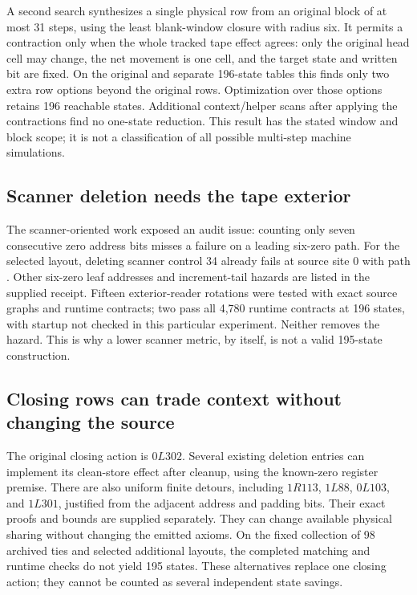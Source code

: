 \documentclass[11pt,a4paper]{article}
\newcommand{\code}[1]{\texttt{\detokenize{#1}}}
\begin{document}
A second search synthesizes a single physical row from an original block
of at most 31 steps, using the least blank-window closure with radius six.
It permits a contraction only when the whole tracked tape effect agrees:
only the original head cell may change, the net movement is one cell, and
the target state and written bit are fixed. On the original and separate
196-state tables this finds only two extra row options beyond the original
rows. Optimization over those options retains 196 reachable states.
Additional context/helper scans after applying the contractions find no
one-state reduction. This result has the stated window and block scope;
it is not a classification of all possible multi-step machine simulations.

\subsection{Scanner deletion needs the tape exterior}

The scanner-oriented work exposed an audit issue: counting only seven
consecutive zero address bits misses a failure on a leading six-zero path.
For the selected \code{scanner_best196} layout, deleting scanner control
34 already fails at source site 0 with path \code{000000}. Other six-zero
leaf addresses and increment-tail hazards are listed in the supplied
receipt. Fifteen exterior-reader rotations were tested with exact source
graphs and runtime contracts; two pass all 4,780 runtime contracts at 196
states, with startup not checked in this particular experiment. Neither
removes the hazard. This is why a lower scanner metric, by
itself, is not a valid 195-state construction.

\subsection{Closing rows can trade context without changing the source}

The original closing action is $0L302$. Several existing deletion entries
can implement its clean-store effect after cleanup, using the known-zero
register premise. There are also uniform finite detours, including
$1R113$, $1L88$, $0L103$, and $1L301$, justified from the adjacent address
and padding bits. Their exact proofs and bounds are supplied separately.
They can change available physical sharing without changing the emitted
axioms. On the fixed collection of 98 archived ties and selected additional
layouts, the completed matching and runtime checks do not yield 195 states.
These alternatives replace one closing action; they cannot be counted as
several independent state savings.
\end{document}
